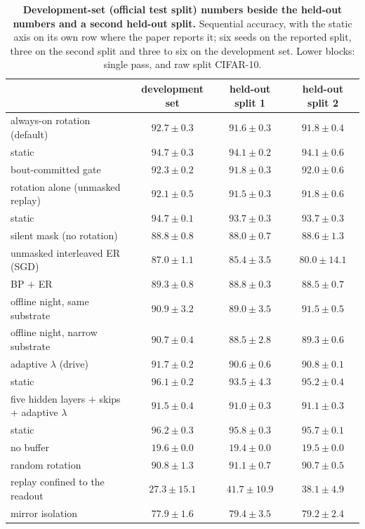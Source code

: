 \documentclass{article}
\begin{document}
\begin{table}[H]
\centering\small
\caption{\textbf{Development-set (official test split) numbers beside the held-out numbers and
a second held-out split.} Sequential accuracy, with the static axis on its own row
where the paper reports it; six seeds on the reported split, three on the second split
and three to six on the development set. Lower blocks: single pass, and raw split CIFAR-10.}
\label{tab:val}
\begin{tabular}{@{}lccc@{}}
\toprule
& development set & held-out split 1 & held-out split 2 \\
\midrule
always-on rotation (default) & $92.7\pm0.3$ & $91.6\pm0.3$ & $91.8\pm0.4$ \\
\quad static & $94.7\pm0.3$ & $94.1\pm0.2$ & $94.1\pm0.6$ \\
bout-committed gate & $92.3\pm0.2$ & $91.8\pm0.3$ & $92.0\pm0.6$ \\
rotation alone (unmasked replay) & $92.1\pm0.5$ & $91.5\pm0.3$ & $91.8\pm0.6$ \\
\quad static & $94.7\pm0.1$ & $93.7\pm0.3$ & $93.7\pm0.3$ \\
silent mask (no rotation) & $88.8\pm0.8$ & $88.0\pm0.7$ & $88.6\pm1.3$ \\
unmasked interleaved ER (SGD) & $87.0\pm1.1$ & $85.4\pm3.5$ & $80.0\pm14.1$ \\
BP $+$ ER & $89.3\pm0.8$ & $88.8\pm0.3$ & $88.5\pm0.7$ \\
offline night, same substrate & $90.9\pm3.2$ & $89.0\pm3.5$ & $91.5\pm0.5$ \\
offline night, narrow substrate & $90.7\pm0.4$ & $88.5\pm2.8$ & $89.3\pm0.6$ \\
adaptive $\lambda$ (drive) & $91.7\pm0.2$ & $90.6\pm0.6$ & $90.8\pm0.1$ \\
\quad static & $96.1\pm0.2$ & $93.5\pm4.3$ & $95.2\pm0.4$ \\
five hidden layers $+$ skips $+$ adaptive $\lambda$ & $91.5\pm0.4$ & $91.0\pm0.3$ & $91.1\pm0.3$ \\
\quad static & $96.2\pm0.3$ & $95.8\pm0.3$ & $95.7\pm0.1$ \\
no buffer & $19.6\pm0.0$ & $19.4\pm0.0$ & $19.5\pm0.0$ \\
random rotation & $90.8\pm1.3$ & $91.1\pm0.7$ & $90.7\pm0.5$ \\
replay confined to the readout & $27.3\pm15.1$ & $41.7\pm10.9$ & $38.1\pm4.9$ \\
mirror isolation & $77.9\pm1.6$ & $79.4\pm3.5$ & $79.2\pm2.4$ \\

\end{tabular}
\end{table}
\end{document}
